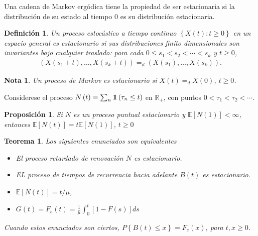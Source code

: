 \documentclass{article}
\newtheorem{Def}{Definición}
\newtheorem{Teo}{Teorema}
\newtheorem{Note}{Nota}
\newtheorem{Prop}{Proposición}
\newcommand{\rea}{\mathbb{R}}
\newcommand{\esp}{\mathbb{E}}
\newcommand{\indora}{\mbox{$1$\hspace{-0.8ex}$1$}}
\begin{document}
Una cadena de Markov erg\'odica tiene la propiedad de ser estacionaria si la distribuci\'on de su estado al tiempo $0$ es su distribuci\'on estacionaria.


\begin{Def}
Un proceso estoc\'astico a tiempo continuo $\left\{X\left(t\right):t\geq0\right\}$ en un espacio general es estacionario si sus distribuciones finito dimensionales son invariantes bajo cualquier  traslado: para cada $0\leq s_{1}<s_{2}<\cdots<s_{k}$ y $t\geq0$,
\begin{eqnarray*}
\left(X\left(s_{1}+t\right),\ldots,X\left(s_{k}+t\right)\right)=_{d}\left(X\left(s_{1}\right),\ldots,X\left(s_{k}\right)\right).
\end{eqnarray*}
\end{Def}

\begin{Note}
Un proceso de Markov es estacionario si $X\left(t\right)=_{d}X\left(0\right)$, $t\geq0$.
\end{Note}

Considerese el proceso $N\left(t\right)=\sum_{n}\indora\left(\tau_{n}\leq t\right)$ en $\rea_{+}$, con puntos $0<\tau_{1}<\tau_{2}<\cdots$.

\begin{Prop}
Si $N$ es un proceso puntual estacionario y $\esp\left[N\left(1\right)\right]<\infty$, entonces $\esp\left[N\left(t\right)\right]=t\esp\left[N\left(1\right)\right]$, $t\geq0$

\end{Prop}

\begin{Teo}
Los siguientes enunciados son equivalentes
\begin{itemize}
\item[i)] El proceso retardado de renovaci\'on $N$ es estacionario.

\item[ii)] EL proceso de tiempos de recurrencia hacia adelante $B\left(t\right)$ es estacionario.


\item[iii)] $\esp\left[N\left(t\right)\right]=t/\mu$,


\item[iv)] $G\left(t\right)=F_{e}\left(t\right)=\frac{1}{\mu}\int_{0}^{t}\left[1-F\left(s\right)\right]ds$
\end{itemize}
Cuando estos enunciados son ciertos, $P\left\{B\left(t\right)\leq x\right\}=F_{e}\left(x\right)$, para $t,x\geq0$.

\end{Teo}
\end{document}
